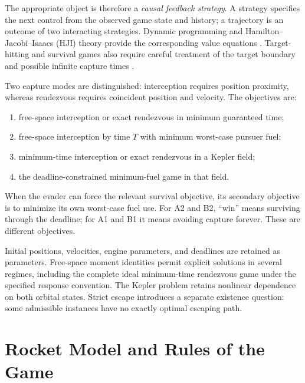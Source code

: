 \documentclass[journal,a4paper]{IEEEtran}
\begin{document}
The appropriate object is therefore a \emph{causal feedback strategy}. A strategy specifies the next control from the observed game state and history; a trajectory is an outcome of two interacting strategies. Dynamic programming and Hamilton--Jacobi--Isaacs (HJI) theory provide the corresponding value equations \cite{EvansSouganidis1984}. Target-hitting and survival games also require careful treatment of the target boundary and possible infinite capture times \cite{Soravia1993}.

Two capture modes are distinguished: interception requires position proximity, whereas rendezvous requires coincident position and velocity. The objectives are:
\begin{enumerate}
\item[A1)] free-space interception or exact rendezvous in minimum guaranteed time;
\item[A2)] free-space interception by time $T$ with minimum worst-case pursuer fuel;
\item[B1)] minimum-time interception or exact rendezvous in a Kepler field;
\item[B2)] the deadline-constrained minimum-fuel game in that field.
\end{enumerate}
When the evader can force the relevant survival objective, its secondary objective is to minimize its own worst-case fuel use. For A2 and B2, ``win'' means surviving through the deadline; for A1 and B1 it means avoiding capture forever. These are different objectives.

Initial positions, velocities, engine parameters, and deadlines are retained as parameters. Free-space moment identities permit explicit solutions in several regimes, including the complete ideal minimum-time rendezvous game under the specified response convention. The Kepler problem retains nonlinear dependence on both orbital states. Strict escape introduces a separate existence question: some admissible instances have no exactly optimal escaping path.

\section{Rocket Model and Rules of the Game}
\label{sec:model}
\end{document}
